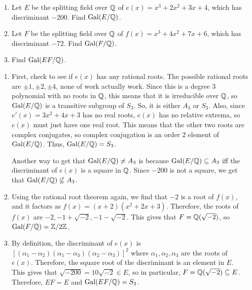 %
\begin{question}[subtitle = January 2019 Problem 4,ID=Jan19_4]
\begin{enumerate}
    \item Let $E$ be the splitting field over $\mathbb{Q}$ of $e(x)=x^3+2x^2+3x+4$, which has discriminant $-200$. Find $\operatorname{Gal}(E/\mathbb{Q})$.
    \item Let $F$ be the splitting field over $\mathbb{Q}$ of $f(x)=x^3+4x^2+7x+6$, which has discriminant $-72$. Find $\operatorname{Gal}(F/\mathbb{Q})$.
    \item Find $\operatorname{Gal}(EF/\mathbb{Q})$.
\end{enumerate}
\end{question}
\begin{solution}
\begin{enumerate}
    \item First, check to see if $e(x)$ has any rational roots. The possible rational roots are $\pm 1, \pm 2, \pm 4$, none of work actually work. Since this is a degree $3$ polynomial with no roots in $\mathbb{Q}$, this means that it is irreducible over $\mathbb{Q}$, so $\operatorname{Gal}(E/\mathbb{Q})$ is a transitive subgroup of $S_3$. So, it is either $A_3$ or $S_3$. Also, since $e'(x)=3x^2+4x+3$ has no real roots, $e(x)$ has no relative extrema, so $e(x)$ must just have one real root. This means that the other two roots are complex conjugates, so complex conjugation is an order 2 element of $\operatorname{Gal}(E/\mathbb{Q})$. Thus, $\operatorname{Gal}(E/\mathbb{Q})=S_3$.
    
    Another way to get that $\operatorname{Gal}(E/\mathbb{Q}) \neq A_3$ is because $\operatorname{Gal}(E/\mathbb{Q}) \subseteq A_3$ iff the discriminant of $e(x)$ is a square in $\mathbb{Q}$. Since $-200$ is not a square, we get that $\operatorname{Gal}(E/\mathbb{Q}) \not\subseteq A_3$.
    \item Using the rational root theorem again, we find that $-2$ is a root of $f(x)$, and it factors as $f(x)=(x+2)(x^2+2x+3)$. Therefore, the roots of $f(x)$ are $-2, -1+\sqrt{-2}, -1-\sqrt{-2}$. This gives that $F=\mathbb{Q}(\sqrt{-2})$, so $\operatorname{Gal}(F/\mathbb{Q})=\mathbb{Z}/2\mathbb{Z}$.
    \item By definition, the discriminant of $e(x)$ is $[(\alpha_1-\alpha_2)(\alpha_1-\alpha_3)(\alpha_2-\alpha_3)]^2$ where $\alpha_1,\alpha_2,\alpha_3$ are the roots of $e(x)$. Therefore, the square root of the discriminant is an element in $E$. This gives that $\sqrt{-200}=10\sqrt{-2} \in E$, so in particular, $F=\mathbb{Q}(\sqrt{-2})\subseteq E$. Therefore, $EF=E$ and $\operatorname{Gal}(EF/\mathbb{Q})=S_3$.
\end{enumerate}
\end{solution}

